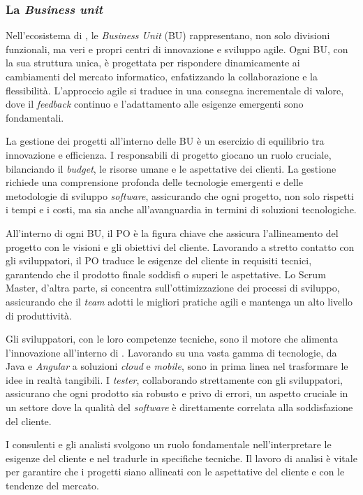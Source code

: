  \subsubsection{\textbf{La \textit{Business unit}}}

 \noindent Nell'ecosistema di \azienda{}, le \textit{Business Unit} (BU) rappresentano, non solo divisioni funzionali, ma veri e propri centri di innovazione e sviluppo agile. 
 Ogni BU, con la sua struttura unica, è progettata per rispondere dinamicamente ai cambiamenti del mercato informatico, enfatizzando la collaborazione e la flessibilità. 
 L'approccio agile si traduce in una consegna incrementale di valore, dove il \textit{feedback} continuo e l'adattamento alle esigenze emergenti sono fondamentali.
 
 \noindent La gestione dei progetti all'interno delle BU è un esercizio di equilibrio tra innovazione e efficienza. I responsabili di progetto giocano un ruolo cruciale, 
 bilanciando il \textit{budget}, le risorse umane e le aspettative dei clienti. 
 La gestione richiede una comprensione profonda delle tecnologie emergenti e delle metodologie di sviluppo \textit{software}, 
 assicurando che ogni progetto, non solo rispetti i tempi e i costi, ma sia anche all'avanguardia in termini di soluzioni tecnologiche.
 
 \noindent All'interno di ogni BU, il \gls{PO} è la figura chiave che assicura l'allineamento del progetto con le visioni e gli obiettivi del cliente. 
 Lavorando a stretto contatto con gli sviluppatori, il PO traduce le esigenze del cliente in requisiti tecnici, garantendo che il prodotto finale soddisfi o superi le aspettative. 
 Lo \gls{Scrum Master}, d'altra parte, si concentra sull'ottimizzazione dei processi di sviluppo, assicurando che il \textit{team} adotti le migliori pratiche agili e mantenga un alto 
 livello di produttività.
 
 \noindent Gli sviluppatori, con le loro competenze tecniche, sono il motore che alimenta l'innovazione all'interno di \azienda. 
 Lavorando su una vasta gamma di tecnologie, da Java e \textit{Angular} a soluzioni \textit{cloud} e \textit{mobile}, sono in prima linea nel trasformare le idee in realtà tangibili. 
 I \textit{tester}, collaborando strettamente con gli sviluppatori, assicurano che ogni prodotto sia robusto e privo di errori, un aspetto cruciale in un settore dove 
 la qualità del \textit{software} è direttamente correlata alla soddisfazione del cliente.
 
 \noindent I consulenti e gli \gls{analisti} svolgono un ruolo fondamentale nell'interpretare le esigenze del cliente e nel tradurle in specifiche tecniche. 
 Il lavoro di analisi è vitale per garantire che i progetti siano allineati con le aspettative del cliente e con le tendenze del mercato.
 
